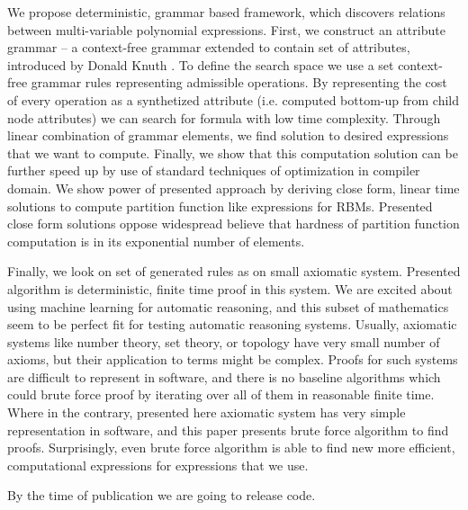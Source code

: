 \documentclass{article}
\begin{document}
We propose deterministic, grammar based framework, which discovers relations between
multi-variable polynomial expressions. First, we construct an attribute grammar
-- a context-free grammar extended to contain set of attributes, introduced by
Donald Knuth \cite{knuth1968semantics}. To define the search space we use a set
context-free grammar rules representing admissible operations. By representing
the cost of every operation as a synthetized attribute (i.e. computed bottom-up from child node attributes)
we can search for formula with low time complexity.
Through linear combination of grammar elements, we find solution to desired 
expressions that we want to compute. Finally, we
show that this computation solution can be further speed up by use of standard
techniques of optimization in compiler domain. We show power of presented
approach by deriving close form, linear time solutions to compute partition
function like expressions for RBMs. Presented close form solutions oppose
widespread believe that hardness of partition function computation is in its
exponential number of elements.


Finally, we look on set of generated rules as on small axiomatic system.
Presented algorithm is deterministic, finite time proof in this system.
We are excited about using machine learning for automatic reasoning, and
this subset of mathematics seem to be perfect fit for testing automatic reasoning systems.
Usually, axiomatic systems like number theory, set theory, or topology have very small
number of axioms, but their application to terms might be complex. Proofs
for such systems are difficult to represent in software, and there is no
baseline algorithms which could brute force proof by iterating over all of them in reasonable finite time.
Where in the contrary, presented here axiomatic system has very simple representation
in software, and this paper presents brute force algorithm to find proofs. 
Surprisingly, even brute force algorithm is able to find new more efficient,
computational expressions for expressions that we use.

By the time of publication we are going to release code.
\end{document}
